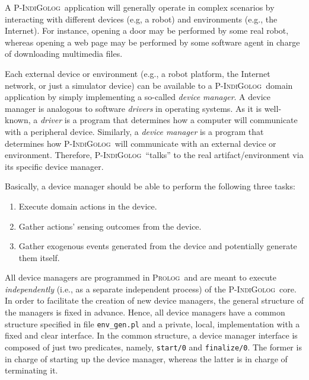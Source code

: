 \documentclass[11pt]{article}
\newcommand{\PIndiGolog}{\mbox{\textsc{P-IndiGolog}}}
\newcommand{\Prolog}{\mbox{\textsc{Prolog}}}
\begin{document}
A \PIndiGolog\ application will generally operate in complex scenarios by
interacting with different devices (e.g, a robot) and environments (e.g., the
Internet). For instance, opening a door may be performed by some real
robot, whereas opening a web page may be performed by some software agent in
charge of downloading multimedia files.

Each external device or environment (e.g., a robot platform, the Internet
network, or just a simulator device) can be available to a \PIndiGolog\ domain
application by simply implementing a so-called \textit{device manager}.
%
A device manager is analogous to software \textit{drivers} in operating
systems. As it is well-known, a \textit{driver} is a program that determines
how a computer will communicate with a peripheral device. Similarly, a
\textit{device manager} is a program that determines how \PIndiGolog\ will
communicate with an external device or environment.
Therefore, \PIndiGolog\ ``talks'' to the real artifact/environment via its
specific device manager.

Basically, a device manager should be able to perform the following three
tasks: 

\begin{enumerate}
\item Execute domain actions in the device.
\item Gather actions' sensing outcomes from the device.
\item Gather exogenous events generated from the device and potentially
generate them itself.
\end{enumerate} 

All device managers are programmed in \Prolog\ and are meant to execute
\textit{independently} (i.e., as a separate independent process) of the
\PIndiGolog\ core.
%
In order to facilitate the creation of new device managers, the general
structure of the managers is fixed in advance. Hence, all device managers have
a common structure specified in file \texttt{env\_gen.pl} and a private, local,
implementation with a fixed and clear interface.
%
In the common structure, a device manager interface is composed of just two
predicates, namely, \texttt{start/0} and \texttt{finalize/0}. The former is in
charge of starting up the device manager, whereas the latter is in charge of
terminating it.
\end{document}
